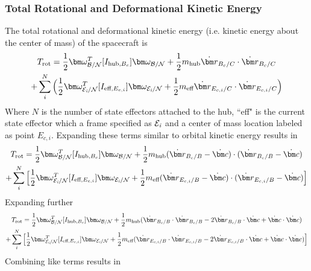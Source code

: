 \subsubsection{Total Rotational and Deformational Kinetic Energy}

The total rotational and deformational kinetic energy (i.e. kinetic energy about the center of mass) of the spacecraft is
\begin{multline}
T_{\text{rot}} = \frac{1}{2} \bm \omega_{\cal{B/N}}^T [I_{\text{hub},B_c}] \bm \omega_{\cal{B/N}} + \frac{1}{2} m_{\text{hub}} \dot{\bm r}_{B_c/C} \cdot \dot{\bm r}_{B_c/C} \\
+ \sum\limits_{i}^{N}\Big(\frac{1}{2} \bm \omega_{\cal{E}_{\textit{i}}/\cal{N}}^T [I_{\text{eff},E_{c,i}}] \bm \omega_{\cal{E}_{\textit{i}}/\cal{N}}
+ \frac{1}{2} m_{\text{eff}} \dot{\bm r}_{E_{c,i}/C} \cdot \dot{\bm r}_{E_{c,i}/C}\Big)
\end{multline}
Where $N$ is the number of state effectors attached to the hub, ``eff" is the current state effector which a frame specified as $\cal{E}_{\textit{i}}$ and a center of mass location labeled as point $E_{c,i}$. Expanding these terms similar to orbital kinetic energy results in
\begin{multline}
T_{\text{rot}} = \frac{1}{2} \bm \omega_{\cal{B/N}}^T [I_{\text{hub},B_c}] \bm \omega_{\cal{B/N}} + \frac{1}{2} m_{\text{hub}} (\dot{\bm r}_{B_c/B} - \dot{\bm c}) \cdot (\dot{\bm r}_{B_c/B} - \dot{\bm c}) \\
+ \sum\limits_{i}^{N}\Big[\frac{1}{2} \bm \omega_{\cal{E}_{\textit{i}}/\cal{N}}^T [I_{\text{eff},E_{c,i}}] \bm \omega_{\cal{E}_{\textit{i}}/\cal{N}}
+ \frac{1}{2} m_{\text{eff}} (\dot{\bm r}_{E_{c,i}/B} - \dot{\bm c}) \cdot (\dot{\bm r}_{E_{c,i}/B} - \dot{\bm c})\Big]
\end{multline}
Expanding further
\begin{multline}
T_{\text{rot}} = \frac{1}{2} \bm \omega_{\cal{B/N}}^T [I_{\text{hub},B_c}] \bm \omega_{\cal{B/N}} + \frac{1}{2} m_{\text{hub}} (\dot{\bm r}_{B_c/B}\cdot\dot{\bm r}_{B_c/B} - 2 \dot{\bm r}_{B_c/B} \cdot \dot{\bm c}  + \dot{\bm c} \cdot \dot{\bm c}) \\
+ \sum\limits_{i}^{N}\Big[\frac{1}{2} \bm \omega_{\cal{E}_{\textit{i}}/\cal{N}}^T [I_{\text{eff},E_{c,i}}] \bm \omega_{\cal{E}_{\textit{i}}/\cal{N}}
+ \frac{1}{2} m_{\text{eff}} (\dot{\bm r}_{E_{c,i}/B} \cdot \dot{\bm r}_{E_{c,i}/B} - 2 \dot{\bm r}_{E_{c,i}/B} \cdot \dot{\bm c} + \dot{\bm c} \cdot \dot{\bm c})\Big]
\end{multline}
Combining like terms results in
